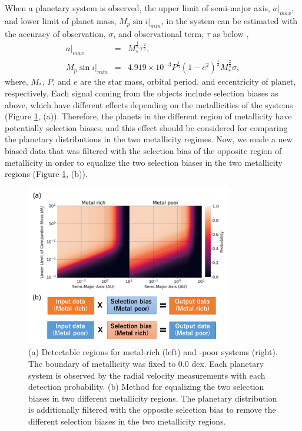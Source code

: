 \documentclass[twocolumn, dvipdfmx]{aastex62}
\begin{document}
\begin{CJK*}{UTF8}{min}
When a planetary system is observed, the upper limit of semi-major axis, $a|_{max}$, and lower limit of planet mass, $M_p\sin i|_{min}$, in the system can be estimated with the accuracy of observation, $\sigma$, and observational term, $\tau$ as below \citep{2008ApJ...677.1324T},
\begin{eqnarray}
a|_{max} &=& M_{*}^{\frac{1}{3}}\tau^{\frac{2}{3}} , \\
M_p\sin i|_{min} &=& 4.919\times10^{-3}P^{\frac{1}{3}}(1-e^2)^{\frac{1}{2}}M_{*}^{\frac{2}{3}}\sigma ,
\end{eqnarray}
where, $M_*$, $P$, and $e$ are the star mass, orbital period, and eccentricity of planet, respectively. Each signal coming from the objects include selection biases as above, which have different effects depending on the metallicities of the systems (Figure \ref{fig:bias}, (a)). Therefore, the planets in the different region of metallicity have potentially selection biases, and this effect should be considered for comparing the planetary distributions in the two metallicity regimes. Now, we made a new biased data that was filtered with the selection bias of the opposite region of metallicity in order to equalize the two selection biases in the two metallicity regions (Figure \ref{fig:bias}, (b)). 

\begin{figure}[t]
\begin{center}
\includegraphics[width=9cm]{../../../Figure/selection_bias.pdf}
\caption{(a) Detectable regions for metal-rich (left) and -poor systems (right). The boundary of metallicity was fixed to 0.0 dex. Each planetary system is observed by the radial velocity measurements with each detection probability. (b) Method for equalizing the two selection biases in two different metallicity regions. The planetary distribution is additionally filtered with the opposite selection bias to remove the different selection biases in the two metallicity regions. \label{fig:bias}}
\end{center}
\end{figure}



\end{CJK*}
\end{document}
